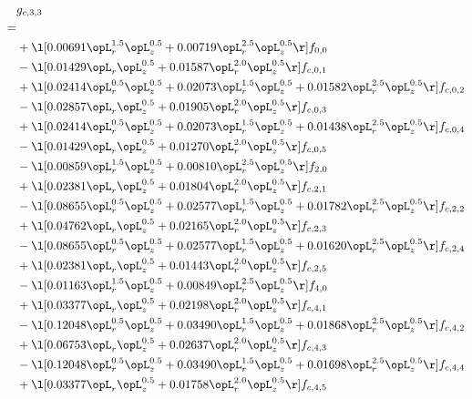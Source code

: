 \begin{alignat}{2} 
\label{eq:g_33_0} 
& g_{c,3,3} \nonumber \\ 
 = \\ 
& + \l[  0.00691 \opL_r^{1.5} \opL_z^{0.5} +  0.00719 \opL_r^{2.5} \opL_z^{0.5}  \r] f_{0,0} \nonumber \\ 
& - \l[  0.01429 \opL_r \opL_z^{0.5} +  0.01587 \opL_r^{2.0} \opL_z^{0.5}  \r] f_{c,0,1} \nonumber \\ 
& + \l[  0.02414 \opL_r^{0.5} \opL_z^{0.5} +  0.02073 \opL_r^{1.5} \opL_z^{0.5} +  0.01582 \opL_r^{2.5} \opL_z^{0.5}  \r] f_{c,0,2} \nonumber \\ 
& - \l[  0.02857 \opL_r \opL_z^{0.5} +  0.01905 \opL_r^{2.0} \opL_z^{0.5}  \r] f_{c,0,3} \nonumber \\ 
& + \l[  0.02414 \opL_r^{0.5} \opL_z^{0.5} +  0.02073 \opL_r^{1.5} \opL_z^{0.5} +  0.01438 \opL_r^{2.5} \opL_z^{0.5}  \r] f_{c,0,4} \nonumber \\ 
& - \l[  0.01429 \opL_r \opL_z^{0.5} +  0.01270 \opL_r^{2.0} \opL_z^{0.5}  \r] f_{c,0,5} \nonumber \\ 
& - \l[  0.00859 \opL_r^{1.5} \opL_z^{0.5} +  0.00810 \opL_r^{2.5} \opL_z^{0.5}  \r] f_{2,0} \nonumber \\ 
& + \l[  0.02381 \opL_r \opL_z^{0.5} +  0.01804 \opL_r^{2.0} \opL_z^{0.5}  \r] f_{c,2,1} \nonumber \\ 
& - \l[  0.08655 \opL_r^{0.5} \opL_z^{0.5} +  0.02577 \opL_r^{1.5} \opL_z^{0.5} +  0.01782 \opL_r^{2.5} \opL_z^{0.5}  \r] f_{c,2,2} \nonumber \\ 
& + \l[  0.04762 \opL_r \opL_z^{0.5} +  0.02165 \opL_r^{2.0} \opL_z^{0.5}  \r] f_{c,2,3} \nonumber \\ 
& - \l[  0.08655 \opL_r^{0.5} \opL_z^{0.5} +  0.02577 \opL_r^{1.5} \opL_z^{0.5} +  0.01620 \opL_r^{2.5} \opL_z^{0.5}  \r] f_{c,2,4} \nonumber \\ 
& + \l[  0.02381 \opL_r \opL_z^{0.5} +  0.01443 \opL_r^{2.0} \opL_z^{0.5}  \r] f_{c,2,5} \nonumber \\ 
& - \l[  0.01163 \opL_r^{1.5} \opL_z^{0.5} +  0.00849 \opL_r^{2.5} \opL_z^{0.5}  \r] f_{4,0} \nonumber \\ 
& + \l[  0.03377 \opL_r \opL_z^{0.5} +  0.02198 \opL_r^{2.0} \opL_z^{0.5}  \r] f_{c,4,1} \nonumber \\ 
& - \l[  0.12048 \opL_r^{0.5} \opL_z^{0.5} +  0.03490 \opL_r^{1.5} \opL_z^{0.5} +  0.01868 \opL_r^{2.5} \opL_z^{0.5}  \r] f_{c,4,2} \nonumber \\ 
& + \l[  0.06753 \opL_r \opL_z^{0.5} +  0.02637 \opL_r^{2.0} \opL_z^{0.5}  \r] f_{c,4,3} \nonumber \\ 
& - \l[  0.12048 \opL_r^{0.5} \opL_z^{0.5} +  0.03490 \opL_r^{1.5} \opL_z^{0.5} +  0.01698 \opL_r^{2.5} \opL_z^{0.5}  \r] f_{c,4,4} \nonumber \\ 
& + \l[  0.03377 \opL_r \opL_z^{0.5} +  0.01758 \opL_r^{2.0} \opL_z^{0.5}  \r] f_{c,4,5} \nonumber \\ 
\end{alignat} 


